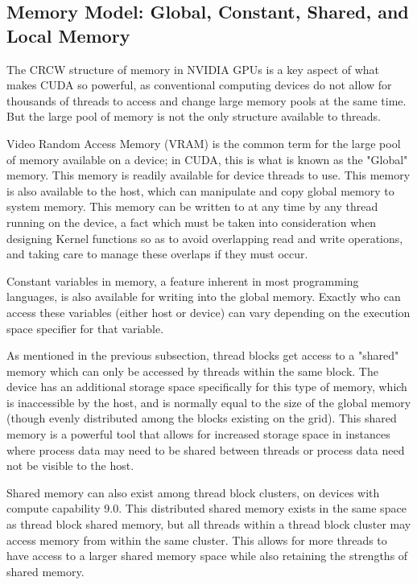 \documentclass[11pt]{report}
\begin{document}
    \subsection{Memory Model: Global, Constant, Shared, and Local Memory}
    The CRCW structure of memory in NVIDIA GPUs is a key aspect of what makes CUDA so powerful, as conventional computing devices do not allow for thousands of threads to access and change large memory pools at the same time. But the large pool of memory is not the only structure available to threads.

    Video Random Access Memory (VRAM) is the common term for the large pool of memory available on a device; in CUDA, this is what is known as the "Global" memory. This memory is readily available for device threads to use. This memory is also available to the host, which can manipulate and copy global memory to system memory. This memory can be written to at any time by any thread running on the device, a fact which must be taken into consideration when designing Kernel functions so as to avoid overlapping read and write operations, and taking care to manage these overlaps if they must occur.

    Constant variables in memory, a feature inherent in most programming languages, is also available for writing into the global memory. Exactly who can access these variables (either host or device) can vary depending on the execution space specifier for that variable.

    As mentioned in the previous subsection, thread blocks get access to a "shared" memory which can only be accessed by threads within the same block. The device has an additional storage space specifically for this type of memory, which is inaccessible by the host, and is normally equal to the size of the global memory (though evenly distributed among the blocks existing on the grid). This shared memory is a powerful tool that allows for increased storage space in instances where process data may need to be shared between threads or process data need not be visible to the host.

    Shared memory can also exist among thread block clusters, on devices with compute capability 9.0. This distributed shared memory exists in the same space as thread block shared memory, but all threads within a thread block cluster may access memory from within the same cluster. This allows for more threads to have access to a larger shared memory space while also retaining the strengths of shared memory.
\end{document}
